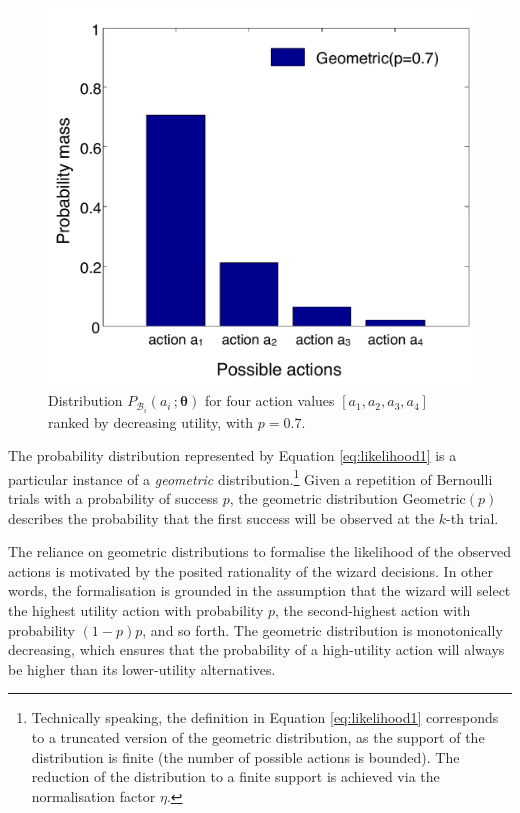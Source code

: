 \begin{figure}
\vspace{-2mm}
\centering
\includegraphics[scale=0.34]{imgs/geometric.pdf} 
\vspace{-6mm}
\caption{Distribution $P_{\mathcal{B}_i}(a_i\,; \boldsymbol\theta)$ for four action values $[a_1, a_2, a_3, a_4]$ ranked by decreasing utility, with $p=0.7$.}
\label{fig:geometric}
\end{figure}
The probability distribution represented by Equation \eqref{eq:likelihood1} is a particular instance of a \textit{geometric} distribution.\footnote{Technically speaking, the definition in Equation \eqref{eq:likelihood1} corresponds to a truncated version of the geometric distribution, as the support of the distribution is finite (the number of possible actions is bounded). The reduction of the distribution to a finite support is achieved via the normalisation factor $\eta$.} Given a repetition of Bernoulli trials with a probability of success $p$, the geometric distribution $\mathrm{Geometric}(p)$  describes the probability that the first success will be observed at the $k$-th trial. 

The reliance on geometric distributions to formalise the likelihood of the observed actions is motivated by the posited rationality of the wizard decisions.  In other words, the formalisation is grounded in the assumption that the wizard will select the highest utility action with probability $p$, the second-highest action with probability $(1-p)p$, and so forth. The geometric distribution is monotonically decreasing, which ensures that the probability of a high-utility action will always be higher than its lower-utility alternatives.   

